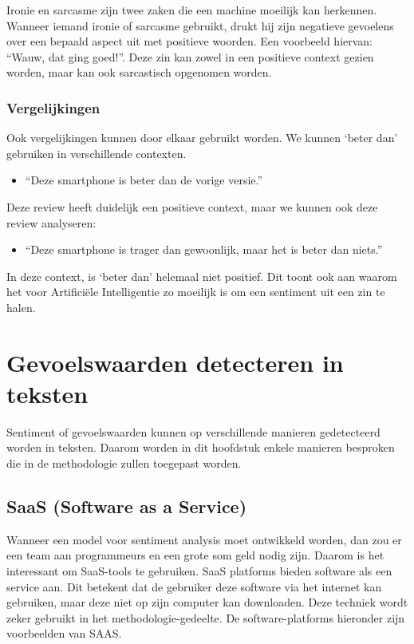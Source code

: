 Ironie en sarcasme zijn twee zaken die een machine moeilijk kan herkennen. Wanneer iemand ironie of sarcasme gebruikt, drukt hij zijn negatieve gevoelens over een bepaald aspect uit met positieve woorden. \autocite{MonkeyLearn2021} Een voorbeeld hiervan: “Wauw, dat ging goed!”. Deze zin kan zowel in een positieve context gezien worden, maar kan ook sarcastisch opgenomen worden. 

\subsubsection{Vergelijkingen}
\label{vergelijkingen}

Ook vergelijkingen kunnen door elkaar gebruikt worden. We kunnen ‘beter dan’ gebruiken in verschillende contexten. 

\begin{itemize}
    \item “Deze smartphone is beter dan de vorige versie.”
\end{itemize}

Deze review heeft duidelijk een positieve context, maar we kunnen ook deze review analyseren:


\begin{itemize}
    \item “Deze smartphone is trager dan gewoonlijk, maar het is beter dan niets.”
\end{itemize}

In deze context, is ‘beter dan’ helemaal niet positief. Dit toont ook aan waarom het voor Artificiële Intelligentie zo moeilijk is om een sentiment uit een zin te halen. 


\section{Gevoelswaarden detecteren in teksten}
\label{gevoelswaardendetecteren}

Sentiment of gevoelswaarden kunnen op verschillende manieren gedetecteerd worden in teksten. Daarom worden in dit hoofdstuk enkele manieren besproken die in de methodologie zullen toegepast worden. 

\subsection{SaaS (Software as a Service)}
\label{saas}

Wanneer een model voor sentiment analysis moet ontwikkeld worden, dan zou er een team aan programmeurs en een grote som geld nodig zijn. Daarom is het interessant om SaaS-tools te gebruiken. SaaS platforms bieden software als een service aan. Dit betekent dat de gebruiker deze software via het internet kan gebruiken, maar deze niet op zijn computer kan downloaden. \autocite{Marketing2021} Deze techniek wordt zeker gebruikt in het methodologie-gedeelte. De software-platforms hieronder zijn voorbeelden van \gls{SAAS}. 


